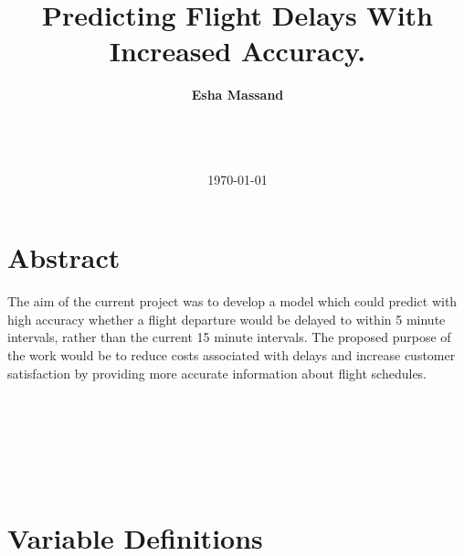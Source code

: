 \documentclass[a4paper, 10pt]{article}
\begin{document}
\LARGE\title{Predicting Flight Delays With Increased Accuracy.}

\LARGE\author{\textbf{Esha Massand}\\
\date{\mydate\today}
\\\
}

\normalsize


\maketitle


\section*{Abstract}
\begin{justify}
The aim of the current project was to develop a model which could predict with high accuracy whether a flight departure would be delayed to within 5 minute intervals, rather than the current 15 minute intervals. The proposed purpose of the work would be to reduce costs associated with delays and increase customer satisfaction by providing more accurate information about flight schedules. 
\end{justify}
\begin{verbatim}






\end{verbatim}


\clearpage
\tableofcontents
\clearpage

\section{Variable Definitions}\label{variables}
\end{document}
